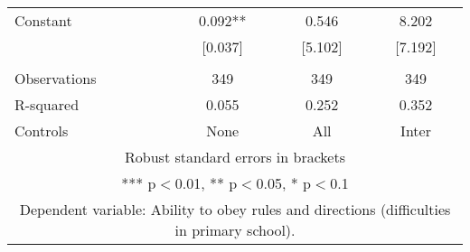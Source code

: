 \begin{tabular}{lccc}
Constant & 0.092** & 0.546 & 8.202 \\
 & [0.037] & [5.102] & [7.192] \\
 &  &  &  \\
Observations & 349 & 349 & 349 \\
R-squared & 0.055 & 0.252 & 0.352 \\
 Controls & None & All & Inter \\ \hline
\multicolumn{4}{c}{ Robust standard errors in brackets} \\
\multicolumn{4}{c}{ *** p$<$0.01, ** p$<$0.05, * p$<$0.1} \\
\multicolumn{4}{c}{ Dependent variable: Ability to obey rules and directions (difficulties in primary school).} \\
\end{tabular}
